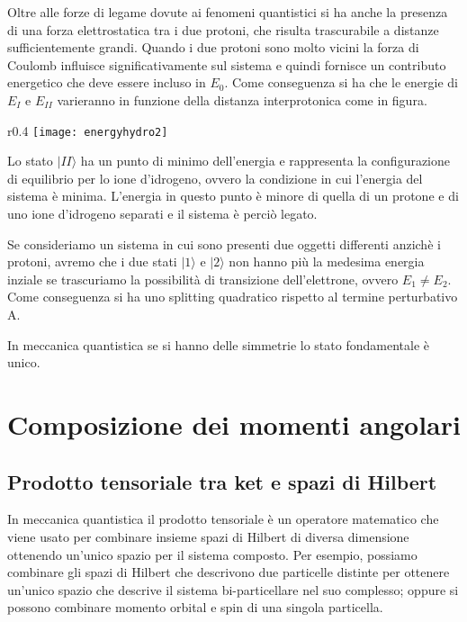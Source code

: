 Oltre alle forze di legame dovute ai fenomeni quantistici si ha anche la presenza di una forza elettrostatica tra i due protoni, che risulta trascurabile a distanze sufficientemente grandi. Quando i due protoni sono molto vicini la forza di Coulomb influisce significativamente sul sistema e quindi fornisce un contributo energetico che deve essere incluso in $E_0$. Come conseguenza si ha che le energie di $E_{I}$ e $E_{II}$ varieranno in funzione della distanza interprotonica come in figura.
\newpage

\begin{wrapfigure}{r}{0.4\textwidth} %
    \centering
    \texttt{[image: energyhydro2]} %
\end{wrapfigure}
Lo stato $|II \rangle$  ha un punto di minimo dell'energia e rappresenta la configurazione di equilibrio per lo ione d'idrogeno, ovvero la condizione in cui l'energia del sistema \`e minima. L'energia in questo punto \`e minore di quella di un protone e di uno ione d'idrogeno separati e il sistema \`e perci\`o legato.

Se consideriamo un sistema in cui sono presenti due oggetti differenti anzich\`e i protoni, avremo che i due stati $|1 \rangle$ e $|2 \rangle$ non hanno pi\`u la medesima energia inziale se trascuriamo la possibilit\`a di transizione dell'elettrone, ovvero $E_1 \neq E_2$. Come conseguenza si ha uno splitting quadratico rispetto al termine perturbativo A.

\begin{remark}
In meccanica quantistica se si hanno delle simmetrie lo stato fondamentale \`e unico. 
\end{remark}

\section{Composizione dei momenti angolari}

\subsection{Prodotto tensoriale tra ket e spazi di Hilbert}

In meccanica quantistica il prodotto tensoriale \`e un operatore matematico che viene usato per combinare insieme spazi di Hilbert di diversa dimensione ottenendo un'unico spazio per il sistema composto. Per esempio, possiamo combinare gli spazi di Hilbert che descrivono due particelle distinte per ottenere un'unico spazio che descrive il sistema bi-particellare nel suo complesso; oppure si possono combinare momento orbital e spin di una singola particella.

